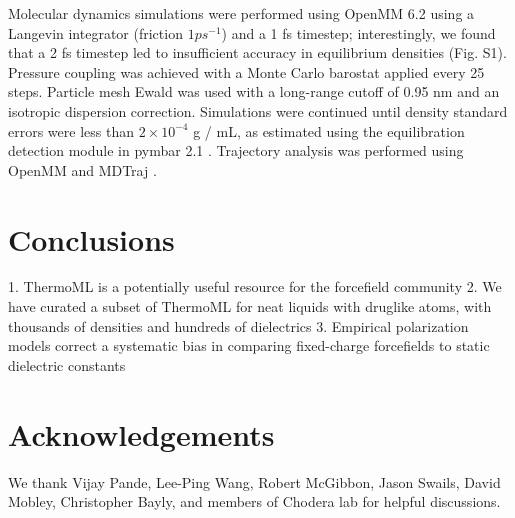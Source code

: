 \documentclass[journal=jacsat,manuscript=article]{achemso}
\begin{document}
Molecular dynamics simulations were performed using OpenMM 6.2 using a Langevin integrator (friction $1 ps^{-1}$) and a 1 fs timestep; interestingly, we found that a 2 fs timestep led to insufficient accuracy in equilibrium densities (Fig. S1).  Pressure coupling was achieved with a Monte Carlo barostat applied every 25 steps.  Particle mesh Ewald \cite{Darden1993} was used with a long-range cutoff of 0.95 nm and an isotropic dispersion correction.  Simulations were continued until density standard errors were less than $2 \times 10^{-4}$ g / mL, as estimated using the equilibration detection module in pymbar 2.1 \cite{shirts2008statistically}.  Trajectory analysis was performed using OpenMM \cite{eastman2012openmm} and MDTraj \cite{mcgibbon2014mdtraj}.  

\section{Conclusions}

1.  ThermoML is a potentially useful resource for the forcefield community
2.  We have curated a subset of ThermoML for neat liquids with druglike atoms, with thousands of densities and hundreds of dielectrics
3.  Empirical polarization models correct a systematic bias in comparing fixed-charge forcefields to static dielectric constants


\section{Acknowledgements}

We thank Vijay Pande, Lee-Ping Wang, Robert McGibbon, Jason Swails, David Mobley, Christopher Bayly, and members of Chodera lab for helpful discussions.  


\end{document}
